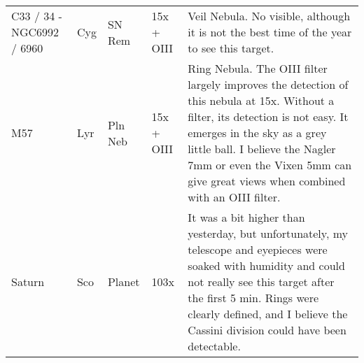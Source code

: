 \begin{longtable}{ p{0.7in}  p{0.3in}  p{0.6in}  p{0.9in}  p{5.8in} }
C33 / 34 - NGC6992 / 6960 & Cyg & SN Rem & 15x + OIII & Veil Nebula. No visible, although it is not the best time of the year to see this target. \\ 
M57 & Lyr & Pln Neb & 15x + OIII & Ring Nebula. The OIII filter largely improves the detection of this nebula at 15x. Without a filter, its detection is not easy. It emerges in the sky as a grey little ball. I believe the Nagler 7mm or even the Vixen 5mm can give great views when combined with an OIII filter. \\ 
Saturn & Sco & Planet & 103x & It was a bit higher than yesterday, but unfortunately, my telescope and eyepieces were soaked with humidity and could not really see this target after the first 5 min. Rings were clearly defined, and I believe the Cassini division could have been detectable. \\ 
\hline 
\end{longtable} 
